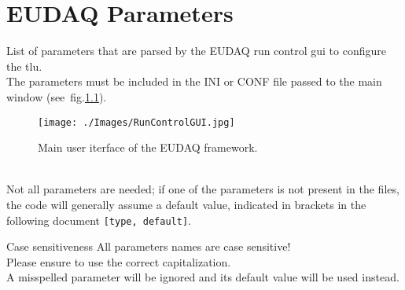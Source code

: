 \chapter{EUDAQ Parameters}\label{ch:EUDAQPar}
List of parameters that are parsed by the EUDAQ run control \gls{gui} to configure the \gls{tlu}.\\
The parameters must be included in the INI or CONF file passed to the main window (see~fig.\ref{fig:EUDAQGui}).
\begin{figure}
  \centering
  \texttt{[image: ./Images/RunControlGUI.jpg]}
  \caption{Main user iterface of the EUDAQ framework.}
  \label{fig:EUDAQGui}
\end{figure}\\
Not all parameters are needed; if one of the parameters is not present in the files, the code will generally assume a default value, indicated in brackets in the following document \verb|[type, default]|.
\begin{alertinfo}{Case sensitiveness}
    All parameters names are case sensitive!\\
    Please ensure to use the correct capitalization.\\
    A misspelled parameter will be ignored and its default value will be used instead.
\end{alertinfo}

